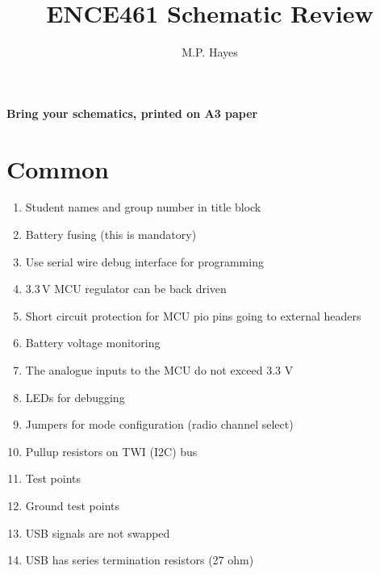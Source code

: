 \documentclass[a4paper, 12pt]{article}
\title{ENCE461 Schematic Review}
\author{M.P. Hayes}
\date{}
\begin{document}
\maketitle


\begin{center}
\textbf{Bring your schematics, printed on A3 paper}
\end{center}


\section{Common}

\begin{enumerate}
\item Student names and group number in title block

\item Battery fusing (this is mandatory)

\item Use serial wire debug interface for programming

\item 3.3\,V MCU regulator can be back driven

\item Short circuit protection for MCU pio pins going to external headers

\item Battery voltage monitoring

\item The analogue inputs to the MCU do not exceed 3.3 V

\item LEDs for debugging

\item Jumpers for mode configuration (radio channel select)

\item Pullup resistors on TWI (I2C) bus

\item Test points

\item Ground test points

\item USB signals are not swapped

\item USB has series termination resistors (27 ohm)



\end{enumerate}
\end{document}

